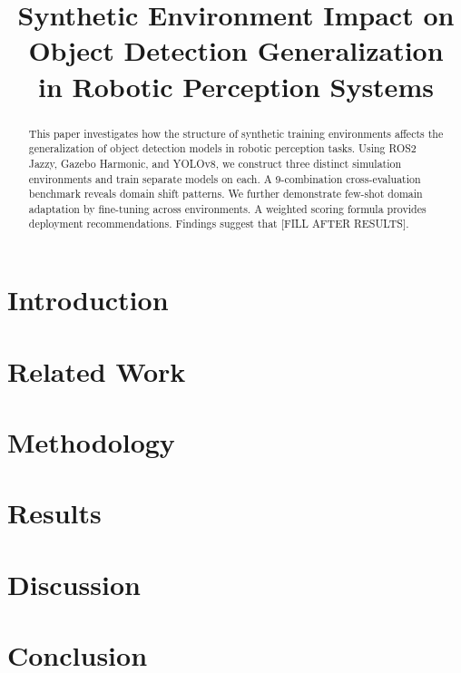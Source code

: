 \documentclass[conference]{IEEEtran}
\title{Synthetic Environment Impact on Object Detection Generalization\\
in Robotic Perception Systems}
\author{\IEEEauthorblockN{Sahan}
\IEEEauthorblockA{Department of Computer Engineering\\
University of Ruhuna, Sri Lanka}}
\begin{document}
\maketitle

\begin{abstract}
This paper investigates how the structure of synthetic training environments
affects the generalization of object detection models in robotic perception tasks.
Using ROS2 Jazzy, Gazebo Harmonic, and YOLOv8, we construct three distinct
simulation environments and train separate models on each.
A 9-combination cross-evaluation benchmark reveals domain shift patterns.
We further demonstrate few-shot domain adaptation by fine-tuning across environments.
A weighted scoring formula provides deployment recommendations.
Findings suggest that [FILL AFTER RESULTS].
\end{abstract}

\section{Introduction}

\section{Related Work}

\section{Methodology}

\section{Results}

\section{Discussion}

\section{Conclusion}



\end{document}
